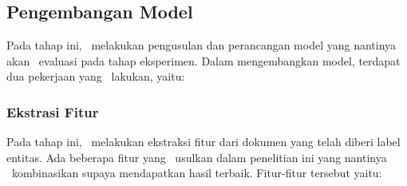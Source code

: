 	\subsection{Pengembangan Model}
	Pada tahap ini, \saya~melakukan pengusulan dan perancangan model yang nantinya akan \saya~evaluasi pada tahap eksperimen. Dalam mengembangkan model, terdapat dua pekerjaan yang \saya~lakukan, yaitu:
	
	\subsubsection{Ekstrasi Fitur}
	Pada tahap ini, \saya~melakukan ekstraksi fitur dari dokumen yang telah diberi label entitas. Ada beberapa fitur yang \saya~usulkan dalam penelitian ini yang nantinya \saya~kombinasikan supaya mendapatkan hasil terbaik. Fitur-fitur tersebut yaitu:
